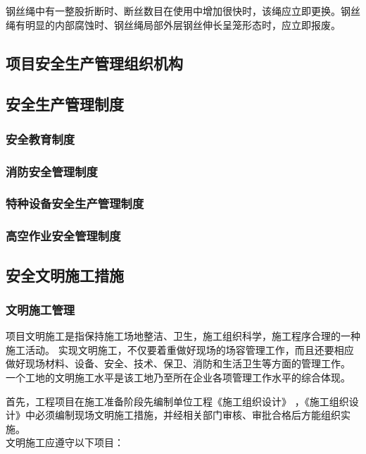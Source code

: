  钢丝绳中有一整股折断时、断丝数目在使用中增加很快时，该绳应立即更换。钢丝绳有明显的内部腐蚀时、钢丝绳局部外层钢丝伸长呈笼形态时，应立即报废。\\

\subsection{项目安全生产管理组织机构}

\subsection{安全生产管理制度}
\subsubsection{安全教育制度}

\subsubsection{消防安全管理制度}

\subsubsection{特种设备安全生产管理制度}

\subsubsection{高空作业安全管理制度}

\subsection{安全文明施工措施}
\subsubsection{文明施工管理}

项目文明施工是指保持施工场地整洁、卫生，施工组织科学，施工程序合理的一种施工活动。
实现文明施工，不仅要着重做好现场的场容管理工作，而且还要相应做好现场材料、设备、安全、技术、保卫、消防和生活卫生等方面的管理工作。
一个工地的文明施工水平是该工地乃至所在企业各项管理工作水平的综合体现。

首先，工程项目在施工准备阶段先编制单位工程《施工组织设计》
，《施工组织设计》中必须编制现场文明施工措施，并经相关部门审核、审批合格后方能组织实施。\\

文明施工应遵守以下项目：

